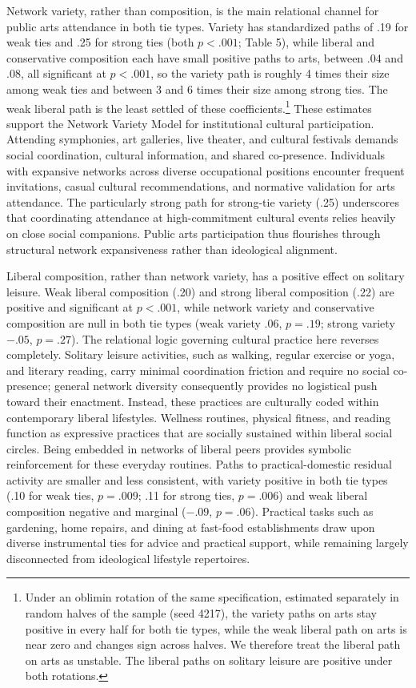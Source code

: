 \documentclass[
  12pt
]{article}
\begin{document}
Network variety, rather than composition, is the main relational channel for public arts attendance in both tie types. Variety has standardized paths of .19 for weak ties and .25 for strong ties (both $p < .001$; Table 5), while liberal and conservative composition each have small positive paths to arts, between .04 and .08, all significant at $p < .001$, so the variety path is roughly 4 times their size among weak ties and between 3 and 6 times their size among strong ties. The weak liberal path is the least settled of these coefficients.\footnote{Under an oblimin rotation of the same specification, estimated separately in random halves of the sample (seed 4217), the variety paths on arts stay positive in every half for both tie types, while the weak liberal path on arts is near zero and changes sign across halves. We therefore treat the liberal path on arts as unstable. The liberal paths on solitary leisure are positive under both rotations.} These estimates support the Network Variety Model for institutional cultural participation. Attending symphonies, art galleries, live theater, and cultural festivals demands social coordination, cultural information, and shared co-presence. Individuals with expansive networks across diverse occupational positions encounter frequent invitations, casual cultural recommendations, and normative validation for arts attendance. The particularly strong path for strong-tie variety (.25) underscores that coordinating attendance at high-commitment cultural events relies heavily on close social companions. Public arts participation thus flourishes through structural network expansiveness rather than ideological alignment.

Liberal composition, rather than network variety, has a positive effect on solitary leisure. Weak liberal composition (.20) and strong liberal composition (.22) are positive and significant at $p < .001$, while network variety and conservative composition are null in both tie types (weak variety .06, $p = .19$; strong variety $-.05$, $p = .27$). The relational logic governing cultural practice here reverses completely. Solitary leisure activities, such as walking, regular exercise or yoga, and literary reading, carry minimal coordination friction and require no social co-presence; general network diversity consequently provides no logistical push toward their enactment. Instead, these practices are culturally coded within contemporary liberal lifestyles. Wellness routines, physical fitness, and reading function as expressive practices that are socially sustained within liberal social circles. Being embedded in networks of liberal peers provides symbolic reinforcement for these everyday routines. Paths to practical-domestic residual activity are smaller and less consistent, with variety positive in both tie types (.10 for weak ties, $p = .009$; .11 for strong ties, $p = .006$) and weak liberal composition negative and marginal ($-.09$, $p = .06$). Practical tasks such as gardening, home repairs, and dining at fast-food establishments draw upon diverse instrumental ties for advice and practical support, while remaining largely disconnected from ideological lifestyle repertoires.
\end{document}

